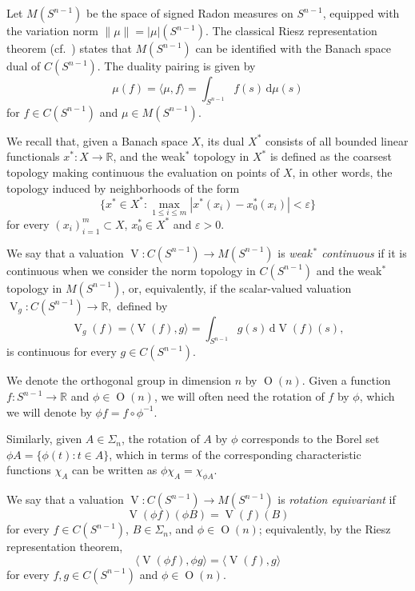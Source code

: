 \documentclass[11pt, a4paper]{amsart}
\renewcommand{\d}{\,\mathrm{d}}
\newcommand{\sn}{{S^{n-1}}}
\newcommand{\on}{\operatorname{O}(n)}
\renewcommand{\d}{\,\mathrm{d}}
\newcommand{\oV}{\operatorname{V}}
\newcommand{\R}{\mathbb R}
\begin{document}
Let $M(\sn )$ be the space of signed Radon measures on $\sn $, equipped with the variation norm $\|\mu\|=|\mu|(\sn )$. The classical Riesz representation theorem (cf.\ \cite[Theorem 7.2.8]{C}) states that $M(\sn )$ can be identified with the Banach space dual of $C(\sn )$. The duality pairing is given by 
\begin{equation}\label{eq:pairing}
\mu(f)=\langle \mu, f\rangle=\int_{\sn } f(s) \d\mu(s)
\end{equation}
for $f\in C(\sn )$ and $\mu\in M(\sn )$.

\goodbreak
We recall that, given a Banach space $X$, its dual $X^*$ consists of all bounded linear functionals $x^*\colon X\to \R$, and the weak$^*$ topology in $X^*$ is defined as the coarsest topology making continuous the evaluation on points of $X$, in other words, the topology induced by neighborhoods of the form $$\{x^*\in X^*:\max_{1\leq i\leq m} |x^*(x_i)-x_0^*(x_i)|<\varepsilon\}$$ for every $(x_i)_{i=1}^{m}\subset X$, $x_0^*\in X^*$ and $\varepsilon>0$.

We say that a valuation $\oV\colon C(\sn )\rightarrow M(\sn )$ is \emph{weak$^{\,*}$ continuous} if it is continuous when we consider the norm topology in $C(\sn )$ and the weak$^*$ topology in $M(\sn )$, or, equivalently, if the scalar-valued valuation 
$\oV_g\colon C(\sn )\rightarrow \R,$
defined  by 
$$\oV_g(f)=\langle \oV(f),g\rangle=\int_{\sn } g(s)\d \oV(f)(s),$$
is continuous for every $g\in C(\sn )$.


We denote the orthogonal group in dimension $n$ by $\on$. 
Given a function $f\colon \sn \to \R$ and $\phi \in \on$, we will often need the rotation of $f$ by $\phi$, which we will denote by $\phi f= f\circ \phi^{-1}$. 

Similarly, given $A\in \Sigma_n$, the rotation of $A$ by $\phi$ corresponds to the Borel set $\phi A=\{\phi(t)\colon t\in A\}$, which in terms of the corresponding characteristic functions $\chi_A$ can be written as $\phi\chi_{A} = \chi_{\phi A}$. 

We say that a valuation $\oV\colon C(\sn )\to M(\sn )$ is {\em rotation equivariant} if 
$$\oV(\phi f)(\phi B)=\oV(f)(B)$$
for every $f\in C(\sn )$, $B\in \Sigma_n$, and $\phi\in \on$;  
equivalently, by the Riesz representation theorem,
$$\langle \oV(\phi f), \phi g\rangle =\langle \oV(f),g\rangle$$
for every $f,g \in C(\sn )$ and $\phi\in \on$.
\end{document}
